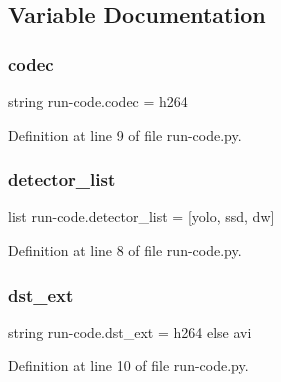 \subsection{Variable Documentation}
\mbox{\label{namespacerun-code_a8fd3f499f581f73e709f1dccdcf91b3f}} 
\subsubsection{\texorpdfstring{codec}{codec}}
{\footnotesize\ttfamily string run-\/code.\+codec = \textquotesingle{}h264\textquotesingle{}}



Definition at line 9 of file run-\/code.\+py.

\mbox{\label{namespacerun-code_a964a9f5de3531be378abf4081befc9d2}} 
\subsubsection{\texorpdfstring{detector\+\_\+list}{detector\_list}}
{\footnotesize\ttfamily list run-\/code.\+detector\+\_\+list = \mbox{[}\textquotesingle{}yolo\textquotesingle{}, \textquotesingle{}ssd\textquotesingle{}, \textquotesingle{}dw\textquotesingle{}\mbox{]}}



Definition at line 8 of file run-\/code.\+py.

\mbox{\label{namespacerun-code_ac7f7fa370ecddff28d73a3ed6c0375e5}} 
\subsubsection{\texorpdfstring{dst\+\_\+ext}{dst\_ext}}
{\footnotesize\ttfamily string run-\/code.\+dst\+\_\+ext = \textquotesingle{}h264\textquotesingle{} else \textquotesingle{}avi\textquotesingle{}}



Definition at line 10 of file run-\/code.\+py.

